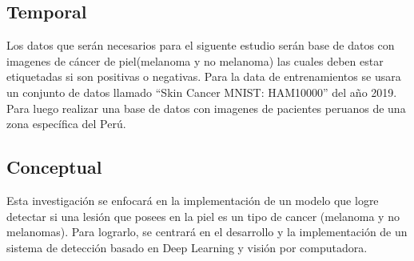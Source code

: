 \subsection{Temporal}
Los datos que serán necesarios para el siguente estudio serán base de datos con imagenes de cáncer de piel(melanoma y no melanoma) las cuales deben estar etiquetadas si son positivas o negativas.
Para la data de entrenamientos se usara un conjunto de datos llamado “Skin Cancer MNIST: HAM10000” del año 2019. Para luego realizar una base de datos con imagenes de pacientes peruanos de una zona específica del Perú.


\subsection{Conceptual}
Esta investigación se enfocará en la implementación de un modelo que logre detectar si una lesión que posees en la piel es un tipo de cancer (melanoma y no melanomas). Para lograrlo, se centrará en el desarrollo y la implementación de un sistema de detección basado en Deep Learning y visión por computadora.

